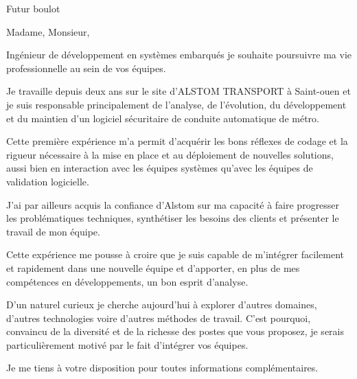 \documentclass[11pt]{lettre}
\makeatletter
\newcommand*{\NoRule}{\renewcommand*{\rule@length}{0}}
\makeatother
\begin{document}
\begin{letter}{Futur boulot}

  \signature{Hoel IRIS}
  \address{Hoel IRIS\\
  54 avenue Mathurin Moreau\\
  75019 Paris\\
  Tel : 06 18 39 30 11\\
  E-Mail : hoel.iris@gmail.com}
  \NoRule
  \notelephone
  \nofax
    \opening{Madame, Monsieur,}
    
    Ingénieur de développement en systèmes embarqués je souhaite poursuivre ma vie professionnelle au sein de vos équipes.
    
    Je travaille depuis deux ans sur le site d'ALSTOM TRANSPORT à Saint-ouen et je suis responsable principalement de l'analyse, de l'évolution, du développement et du maintien d'un logiciel sécuritaire de conduite automatique de métro.
    
    Cette première expérience m'a permit d'acquérir les bons réflexes de codage et la rigueur nécessaire à la mise en place et au déploiement de nouvelles solutions, aussi bien en interaction avec les équipes systèmes qu'avec les équipes de validation logicielle.
    
    J'ai par ailleurs acquis la confiance d'Alstom sur ma capacité à faire progresser les problématiques techniques, synthétiser les besoins des clients et présenter le travail de mon équipe.
    
    Cette expérience me pousse à croire que je suis capable de m'intégrer facilement et rapidement dans une nouvelle équipe et d'apporter, en plus de mes compétences en développements, un bon esprit d'analyse.
    
    D'un naturel curieux je cherche aujourd'hui à explorer d'autres domaines, d'autres technologies voire d'autres méthodes de travail. C'est pourquoi, convaincu de la diversité et de la richesse des postes que vous proposez, je serais particulièrement motivé par le fait d’intégrer vos équipes.
    
    Je me tiens à votre disposition pour toutes informations complémentaires.
 
 
 
 
 


\end{letter}
\end{document}

